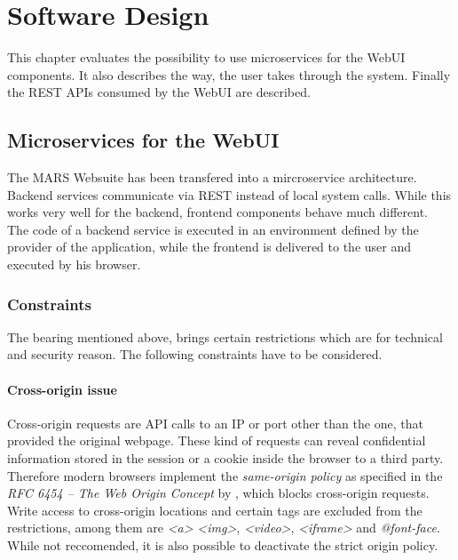 
\chapter{Software Design}
This chapter evaluates the possibility to use microservices for the WebUI components. It also describes the way, the user takes through the system. Finally the REST APIs consumed by the WebUI are described.



\section{Microservices for the WebUI}
\label{sec:MS_for_WebUI}
The MARS Websuite has been transfered into a mircroservice architecture. Backend services communicate via REST instead of local system calls. While this works very well for the backend, frontend components behave much different.\\
The code of a backend service is executed in an environment defined by the provider of the application, while the frontend is delivered to the user and executed by his browser.


\subsection{Constraints}
The bearing mentioned above, brings certain restrictions which are for technical and security reason. The following constraints have to be considered.

\subsubsection{Cross-origin issue}
Cross-origin requests are API calls to an IP or port other than the one, that provided the original webpage. These kind of requests can reveal confidential information stored in the session or a cookie inside the browser to a third party.\\
Therefore modern browsers implement the \textit{same-origin policy} as specified in the \textit{RFC 6454 -- The Web Origin Concept} by \cite{barth2011web}, which blocks cross-origin requests.\\
Write access to cross-origin locations and certain tags are excluded from the restrictions, among them are \textit{<a>} \textit{<img>}, \textit{<video>}, \textit{<iframe>} and \textit{@font-face}. While not reccomended, it is also possible to deactivate the strict origin policy.

